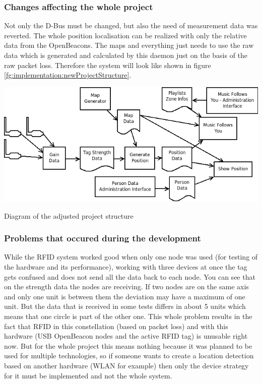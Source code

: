    \subsubsection*{Changes affecting the whole project}
    Not only the D-Bus must be changed, but also the need of measurement data was reverted. The whole position localisation can be realized with only the relative data from the OpenBeacons. The maps and everything just needs to use the raw data which is generated and calculated by this daemon just on the basis of the raw packet loss. Therefore the system will look like shown in figure \ref{fg:implementation:newProjectStructure}.
    \begin{center}
     \begin{staticFigure}
      \includegraphics[scale=0.60]{Diagrams/projectStructureNew.png}
      \caption{Diagram of the adjusted project structure}
      \label{fg:implementation:newProjectStructure}
     \end{staticFigure}
    \end{center}
    
   \subsubsection*{Problems that occured during the development}
    While the RFID system worked good when only one node was used (for testing of the hardware and its performance), working with three devices at once the tag gets confused and does not send all the data back to each node. You can see that on the strength data the nodes are receiving. If two nodes are on the same axis and only one unit is between them the deviation may have a maximum of one unit. But the data that is received in some tests differs in about 5 units which means that one circle is part of the other one. This whole problem results in the fact that RFID in this constellation (based on packet loss) and with this hardware (USB OpenBeacon nodes and the active RFID tag) is unusable right now. But for the whole project this means nothing because it was planned to be used for multiple technologies, so if someone wants to create a location detection based on another hardware (WLAN for example) then only the device strategy for it must be implemented and not the whole system.

